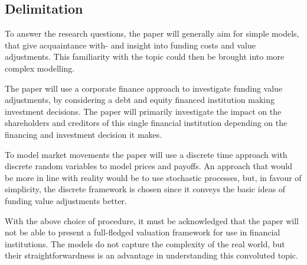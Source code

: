 \documentclass[main.tex]{subfiles}
\begin{document}
    \subsection{Delimitation}

    To answer the research questions, the paper will generally aim for simple models,
    that give acquaintance with- and insight into funding costs and value adjustments.
    This familiarity with the topic could then be brought into more complex modelling.

    The paper will use a corporate finance approach to investigate funding value adjustments,
    by considering a debt and equity financed institution making investment decisions.
    The paper will primarily investigate the impact on the shareholders and creditors 
    of this single financial institution depending on the financing and investment decision it makes.

    To model market movements the paper will use a discrete time approach 
    with discrete random variables to model prices and payoffs.
    An approach that would be more in line with reality would be to use stochastic processes,
    but, in favour of simplicity, the discrete framework is chosen 
    since it conveys the basic ideas of funding value adjustments better.

    With the above choice of procedure, it must be acknowledged that the paper will not be able to
    present a full-fledged valuation framework for use in financial institutions.
    The models do not capture the complexity of the real world,
    but their straightforwardness is an advantage in understanding this convoluted topic.
\end{document}
